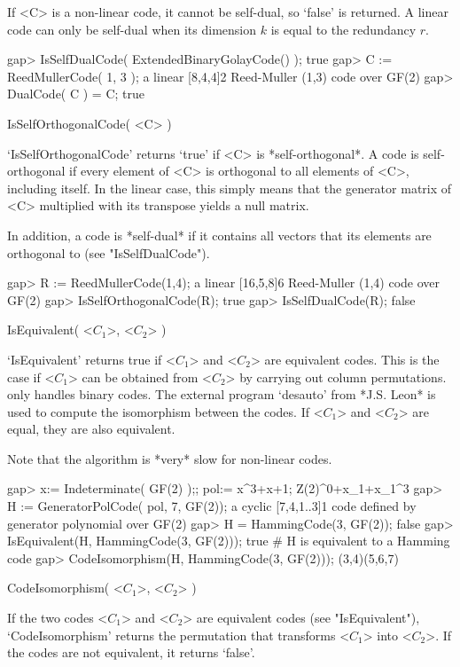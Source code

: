 If  <C> is a   non-linear code,  it cannot be   self-dual, so  `false' is
returned.  A linear code can only be self-dual  when its dimension $k$ is
equal to the redundancy $r$.

\beginexample
gap> IsSelfDualCode( ExtendedBinaryGolayCode() );
true
gap> C := ReedMullerCode( 1, 3 );
a linear [8,4,4]2 Reed-Muller (1,3) code over GF(2)
gap> DualCode( C ) = C;
true 
\endexample

\>IsSelfOrthogonalCode( <C> )

`IsSelfOrthogonalCode'   returns `true' if   <C> is *self-orthogonal*.  A
code  is self-orthogonal  if  every element of  <C>  is orthogonal to all
elements of <C>, including itself. In  the linear case, this simply means
that the  generator matrix of <C>  multiplied with its transpose yields a
null matrix.

In addition, a  code is *self-dual* if it  contains all vectors that  its
elements are orthogonal to (see "IsSelfDualCode").

\beginexample
gap> R := ReedMullerCode(1,4);
a linear [16,5,8]6 Reed-Muller (1,4) code over GF(2)
gap> IsSelfOrthogonalCode(R);
true
gap> IsSelfDualCode(R);
false 
\endexample


\>IsEquivalent( <$C_1$>, <$C_2$> )

`IsEquivalent' returns   true  if <$C_1$> and   <$C_2$>  are equi\-valent
codes.  This is the  case  if <$C_1$> can  be  obtained from <$C_2$>   by
carrying out column permutations. {\GUAVA} only handles binary codes. The
external  program  `desauto' from  *J.S.  Leon* is   used  to compute the
isomorphism between  the codes.  If  <$C_1$> and <$C_2$>  are equal, they
are also equivalent.

Note that the algorithm is *very* slow for non-linear codes.

\beginexample
gap> x:= Indeterminate( GF(2) );; pol:= x^3+x+1; 
Z(2)^0+x_1+x_1^3
gap> H := GeneratorPolCode( pol, 7, GF(2));          
a cyclic [7,4,1..3]1 code defined by generator polynomial over GF(2)
gap> H = HammingCode(3, GF(2));
false
gap> IsEquivalent(H, HammingCode(3, GF(2)));
true                        # H is equivalent to a Hamming code
gap> CodeIsomorphism(H, HammingCode(3, GF(2)));
(3,4)(5,6,7) 
\endexample

\>CodeIsomorphism( <$C_1$>, <$C_2$> )

If the  two   codes <$C_1$>   and <$C_2$>   are  equivalent  codes   (see
"IsEquivalent"), `CodeIsomorphism'    returns   the permutation      that
transforms  <$C_1$> into <$C_2$>.  If the  codes  are not equivalent,  it
returns `false'.

